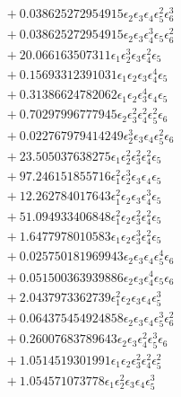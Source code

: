 \documentclass[10pt]{article}
\begin{document}
\begin{align*}
&{}  + 0.038625272954915 \epsilon_{2} \epsilon_{3} \epsilon_{4} \epsilon_{5}^{2} \epsilon_{6}^{3} \\
&{}  + 0.038625272954915 \epsilon_{2} \epsilon_{3} \epsilon_{4}^{3} \epsilon_{5} \epsilon_{6}^{2} \\
&{}  + 20.066163507311 \epsilon_{1} \epsilon_{2}^{3} \epsilon_{3} \epsilon_{4}^{2} \epsilon_{5} \\
&{}  + 0.15693312391031 \epsilon_{1} \epsilon_{2} \epsilon_{3} \epsilon_{4}^{4} \epsilon_{5} \\
&{}  + 0.31386624782062 \epsilon_{1} \epsilon_{2} \epsilon_{3}^{4} \epsilon_{4} \epsilon_{5} \\
&{}  + 0.70297996777945 \epsilon_{2} \epsilon_{3}^{2} \epsilon_{4}^{2} \epsilon_{5}^{2} \epsilon_{6} \\
&{}  + 0.022767979414249 \epsilon_{2}^{3} \epsilon_{3} \epsilon_{4} \epsilon_{5}^{2} \epsilon_{6} \\
&{}  + 23.505037638275 \epsilon_{1} \epsilon_{2}^{2} \epsilon_{3}^{2} \epsilon_{4}^{2} \epsilon_{5} \\
&{}  + 97.246151855716 \epsilon_{1}^{2} \epsilon_{2}^{3} \epsilon_{3} \epsilon_{4} \epsilon_{5} \\
&{}  + 12.262784017643 \epsilon_{1}^{2} \epsilon_{2} \epsilon_{3} \epsilon_{4}^{3} \epsilon_{5} \\
&{}  + 51.094933406848 \epsilon_{1}^{2} \epsilon_{2} \epsilon_{3}^{2} \epsilon_{4}^{2} \epsilon_{5} \\
&{}  + 1.6477978010583 \epsilon_{1} \epsilon_{2} \epsilon_{3}^{3} \epsilon_{4}^{2} \epsilon_{5} \\
&{}  + 0.025750181969943 \epsilon_{2} \epsilon_{3} \epsilon_{4} \epsilon_{5}^{4} \epsilon_{6} \\
&{}  + 0.051500363939886 \epsilon_{2} \epsilon_{3} \epsilon_{4}^{4} \epsilon_{5} \epsilon_{6} \\
&{}  + 2.0437973362739 \epsilon_{1}^{2} \epsilon_{2} \epsilon_{3} \epsilon_{4} \epsilon_{5}^{3} \\
&{}  + 0.064375454924858 \epsilon_{2} \epsilon_{3} \epsilon_{4} \epsilon_{5}^{3} \epsilon_{6}^{2} \\
&{}  + 0.26007683789643 \epsilon_{2} \epsilon_{3} \epsilon_{4}^{2} \epsilon_{5}^{3} \epsilon_{6} \\
&{}  + 1.0514519301991 \epsilon_{1} \epsilon_{2} \epsilon_{3}^{2} \epsilon_{4}^{2} \epsilon_{5}^{2} \\
&{}  + 1.054571073778 \epsilon_{1} \epsilon_{2}^{2} \epsilon_{3} \epsilon_{4} \epsilon_{5}^{3} \\

\end{align*}
\end{document}
